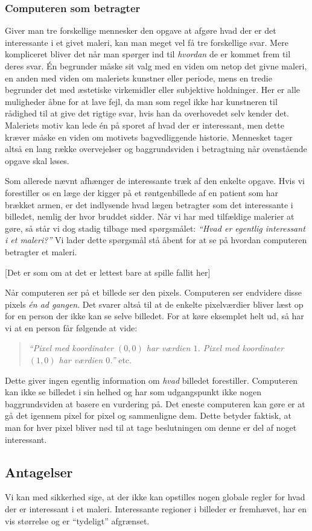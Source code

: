 {\subsubsection*{Computeren som betragter}
Giver man tre forskellige mennesker den opgave at afgøre hvad der er det
interessante i et givet maleri, kan man meget vel få tre forskellige
svar. Mere kompliceret bliver det når man spørger ind til \emph{hvordan}
de er kommet frem til deres svar. Én begrunder måske sit valg med en
viden om netop det givne maleri, en anden med viden om maleriets
kunstner eller periode, mens en tredie begrunder det med æstetiske
virkemidler eller subjektive holdninger. Her er alle muligheder åbne for
at lave fejl, da man som regel ikke har kunstneren til rådighed til at
give det rigtige svar, hvis han da overhovedet selv kender det.
Maleriets motiv kan lede én på sporet af hvad der er interessant, men
dette kræver måske en viden om motivets bagvedliggende historie.
Mennesket tager altså en lang række overvejelser og baggrundsviden i
betragtning når ovenstående opgave skal løses.

Som allerede nævnt afhænger de interessante træk af den enkelte opgave.
Hvis vi forestiller os en læge der kigger på et røntgenbillede af en
patient som har brækket armen, er det indlysende hvad lægen betragter
som det interessante i billedet, nemlig der hvor bruddet sidder. Når vi
har med tilfældige malerier at gøre, så står vi dog stadig tilbage med
spørgsmålet: \emph{``Hvad er egentlig \emph{interessant} i et maleri?''}
Vi lader dette spørgsmål stå åbent for at se på hvordan computeren
betragter et maleri.

[Det er som om at det er lettest bare at spille fallit her]

Når computeren ser på et billede ser den pixels. Computeren ser
endvidere disse pixels \emph{én ad gangen}. Det svarer altså til at de
enkelte pixelværdier bliver læst op for en person der ikke kan se selve
billedet. For at køre eksemplet helt ud, så har vi at en person får
følgende at vide:
\begin{quote}
    \emph{``Pixel med koordinater $(0, 0)$ har værdien $1$. Pixel med
    koordinater $(1, 0)$ har værdien $0$.''} etc.
\end{quote}
Dette giver ingen egentlig information om \emph{hvad} billedet
forestiller. Computeren kan ikke se billedet i sin helhed og har som
udgangspunkt ikke nogen baggrundsviden at basere en vurdering på. Det
eneste computeren kan gøre er at gå det igennem pixel for pixel og
sammenligne dem. Dette betyder faktisk, at man for hver pixel bliver nød
til at tage beslutningen om denne er del af noget interessant.

\subsection{Antagelser}
Vi kan med sikkerhed sige, at der ikke kan opstilles nogen globale
regler for hvad der er interessant i et maleri.  Interessante regioner i
billeder er fremhævet, har en vis størrelse og er ``tydeligt''
afgrænset.

}

